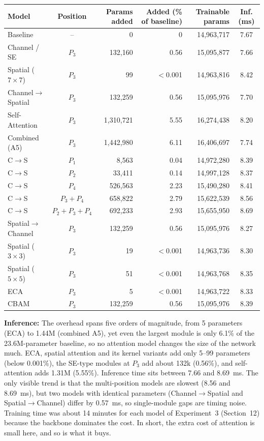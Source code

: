 \documentclass[11pt]{article}
\begin{document}
\begin{center}
\small
\begin{tabular}{|l|c|r|r|r|c|}
\hline
Model & Position & Params added & Added (\% of baseline) & Trainable params & Inf. (ms)\\
\hline
Baseline & -- & 0 & 0 & 14{,}963{,}717 & 7.67\\
Channel / SE & $P_3$ & 132{,}160 & 0.56 & 15{,}095{,}877 & 7.66\\
Spatial ($7{\times}7$) & $P_3$ & 99 & $<$0.001 & 14{,}963{,}816 & 8.42\\
Channel$\rightarrow$Spatial & $P_3$ & 132{,}259 & 0.56 & 15{,}095{,}976 & 7.70\\
Self-Attention & $P_3$ & 1{,}310{,}721 & 5.55 & 16{,}274{,}438 & 8.20\\
Combined (A5) & $P_3$ & 1{,}442{,}980 & 6.11 & 16{,}406{,}697 & 7.74\\
C$\rightarrow$S & $P_1$ & 8{,}563 & 0.04 & 14{,}972{,}280 & 8.39\\
C$\rightarrow$S & $P_2$ & 33{,}411 & 0.14 & 14{,}997{,}128 & 8.37\\
C$\rightarrow$S & $P_4$ & 526{,}563 & 2.23 & 15{,}490{,}280 & 8.41\\
C$\rightarrow$S & $P_3{+}P_4$ & 658{,}822 & 2.79 & 15{,}622{,}539 & 8.56\\
C$\rightarrow$S & $P_2{+}P_3{+}P_4$ & 692{,}233 & 2.93 & 15{,}655{,}950 & 8.69\\
Spatial$\rightarrow$Channel & $P_3$ & 132{,}259 & 0.56 & 15{,}095{,}976 & 8.27\\
Spatial ($3{\times}3$) & $P_3$ & 19 & $<$0.001 & 14{,}963{,}736 & 8.30\\
Spatial ($5{\times}5$) & $P_3$ & 51 & $<$0.001 & 14{,}963{,}768 & 8.35\\
ECA & $P_3$ & 5 & $<$0.001 & 14{,}963{,}722 & 8.33\\
CBAM & $P_3$ & 132{,}259 & 0.56 & 15{,}095{,}976 & 8.39\\
\hline
\end{tabular}
\end{center}

\textbf{Inference:} The overhead spans five orders of magnitude, from 5
parameters (ECA) to 1.44M (combined A5), yet even the largest module is only
6.1\% of the 23.6M-parameter baseline, so no attention model changes the size
of the network much. ECA, spatial attention and its kernel variants add only
5--99 parameters (below 0.001\%), the SE-type modules at $P_3$ add about
132k (0.56\%), and self-attention adds 1.31M (5.55\%). Inference time sits
between 7.66 and 8.69~ms. The only visible trend is that the multi-position
models are slowest (8.56 and 8.69~ms), but two models with identical
parameters (Channel$\rightarrow$Spatial and Spatial$\rightarrow$Channel)
differ by 0.57~ms, so single-module gaps are timing noise. Training time was
about 14 minutes for each model of Experiment~3 (Section~12) because the
backbone dominates the cost. In short, the extra cost of attention is small
here, and so is what it buys.
\end{document}
